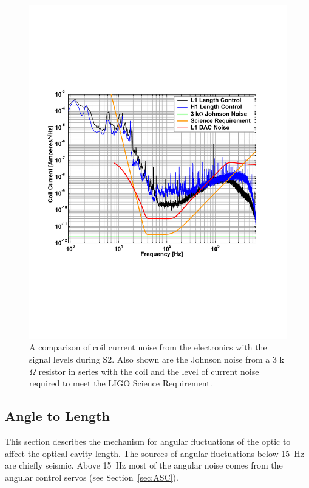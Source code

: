 \begin{figure}[!h]
\centerline{
\includegraphics[angle=0,width=6.5in]{Figures/Chap4/CoilNoise.pdf}}
\caption[DAC Noise]{A comparison of coil current noise from the electronics
         with the signal levels during S2. Also shown are the Johnson noise
         from a 3 k$\Omega$ resistor in series with the coil and the
         level of current noise required to meet the LIGO Science Requirement.}
\label{fig:OutputElectronics}
\end{figure}



\subsection{Angle to Length}

This section describes the mechanism for angular fluctuations of the optic to
affect the optical cavity length. The sources of angular fluctuations below
15~Hz are chiefly seismic. Above 15~Hz most of the angular noise comes from
the angular control servos (see Section~\ref{sec:ASC}).


